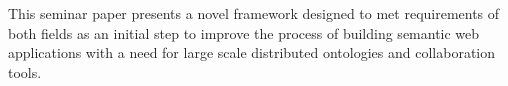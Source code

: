 This seminar paper presents a novel framework designed to met requirements
of both fields as an initial step to improve the process of building 
semantic web applications with a need for large scale distributed
ontologies and collaboration tools.









\clearpage
